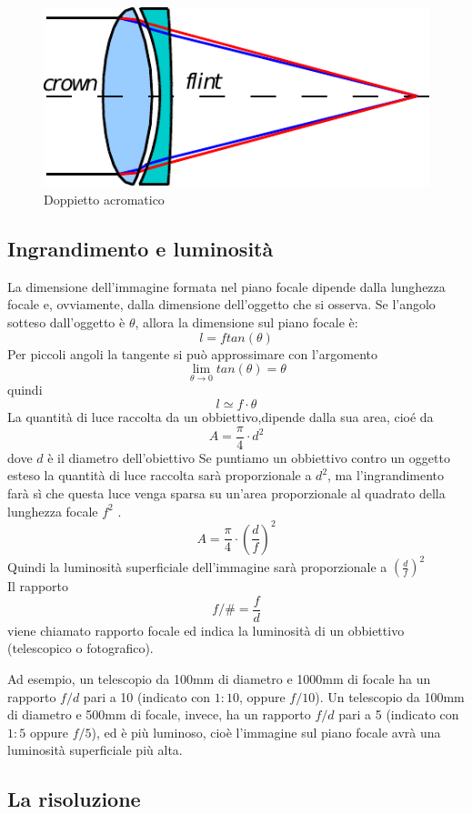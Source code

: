 \begin{figure}

\centering
\includegraphics{img/doppietto-acromatico.pdf}

\caption{Doppietto acromatico}
\label{fig:doppietto-acromatico}
\end{figure}

\subsection{Ingrandimento e luminosità}

La dimensione dell'immagine formata nel piano focale dipende dalla lunghezza
focale e, ovviamente, dalla dimensione dell'oggetto che si osserva. Se
l'angolo sotteso dall'oggetto è $\theta$, allora la dimensione sul piano
focale è: 
\[l = f tan(\theta)\]
Per piccoli angoli la tangente si può approssimare con l'argomento
\[\lim_{\theta \to 0} tan(\theta) = \theta \]
quindi 
\[l \simeq f \cdot \theta\]
La quantità di luce raccolta da un obbiettivo,dipende dalla sua area, cioé da 
\[A=\frac{\pi}{4} \cdot d^2\]
dove $d$ è il diametro dell'obiettivo
Se puntiamo un obbiettivo contro un oggetto esteso la quantità di luce raccolta sarà proporzionale a $d^2$,
ma l'ingrandimento farà sì che questa luce venga sparsa su un'area proporzionale al quadrato della lunghezza focale $f^2$ .
\[A=\frac{\pi}{4} \cdot \left(\frac{d}{f}\right)^2 \]
Quindi la luminosità superficiale dell'immagine sarà proporzionale a $\left(\frac{d}{f}\right)^2 $
\\
Il rapporto 
\[ f/\# = \frac{f}{d} \] 
viene chiamato rapporto focale ed indica la luminosità di un obbiettivo (telescopico o fotografico).

Ad esempio, un telescopio da 100\unit{mm} di diametro e 1000\unit{mm} di focale ha un rapporto $f/d$ pari a 10 (indicato con
$1:10$, oppure $f/10$). Un telescopio da 100\unit{mm} di diametro e 500\unit{mm} di focale, invece, ha un rapporto
$f/d$  pari a 5 (indicato con $1:5$ oppure $f/5$), ed è più luminoso, cioè l'immagine sul piano focale avrà
una luminosità superficiale più alta.

\subsection{La risoluzione}
